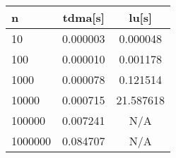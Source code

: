 \begin{tabular}{lcc}\\
\hline 
n & tdma[s] & lu[s] \\\hline 
10 & 0.000003 & 0.000048\\
100 & 0.000010 & 0.001178\\
1000 & 0.000078 & 0.121514\\
10000 & 0.000715 & 21.587618\\
100000 & 0.007241 & N/A\\
1000000 & 0.084707 & N/A\\
\hline 
\end{tabular}